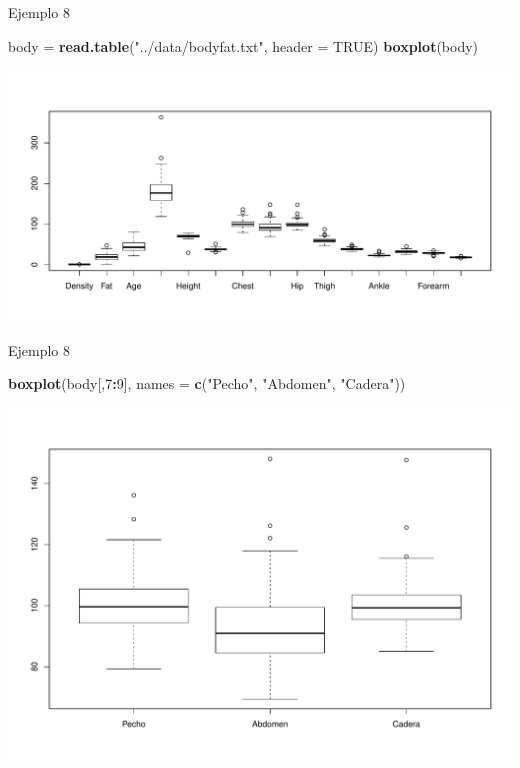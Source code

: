 \documentclass[
  ignorenonframetext,
]{beamer}
\newenvironment{Shaded}{\begin{snugshade}}{\end{snugshade}}
\newcommand{\DataTypeTok}[1]{\textcolor[rgb]{0.13,0.29,0.53}{#1}}
\newcommand{\DecValTok}[1]{\textcolor[rgb]{0.00,0.00,0.81}{#1}}
\newcommand{\KeywordTok}[1]{\textcolor[rgb]{0.13,0.29,0.53}{\textbf{#1}}}
\newcommand{\NormalTok}[1]{#1}
\newcommand{\OperatorTok}[1]{\textcolor[rgb]{0.81,0.36,0.00}{\textbf{#1}}}
\newcommand{\OtherTok}[1]{\textcolor[rgb]{0.56,0.35,0.01}{#1}}
\newcommand{\StringTok}[1]{\textcolor[rgb]{0.31,0.60,0.02}{#1}}
\begin{document}
\begin{frame}[fragile]{Ejemplo 8}
\protect\hypertarget{ejemplo-8}{}

\begin{Shaded}
\begin{Highlighting}[]
\NormalTok{body =}\StringTok{ }\KeywordTok{read.table}\NormalTok{(}\StringTok{"../data/bodyfat.txt"}\NormalTok{, }\DataTypeTok{header =} \OtherTok{TRUE}\NormalTok{)}
\KeywordTok{boxplot}\NormalTok{(body)}
\end{Highlighting}
\end{Shaded}

\includegraphics{Tema8.-Datos-Cuantitativos_files/figure-beamer/unnamed-chunk-27-1.pdf}

\end{frame}

\begin{frame}[fragile]{Ejemplo 8}
\protect\hypertarget{ejemplo-8-1}{}

\begin{Shaded}
\begin{Highlighting}[]
\KeywordTok{boxplot}\NormalTok{(body[,}\DecValTok{7}\OperatorTok{:}\DecValTok{9}\NormalTok{], }\DataTypeTok{names =} \KeywordTok{c}\NormalTok{(}\StringTok{"Pecho"}\NormalTok{, }\StringTok{"Abdomen"}\NormalTok{, }\StringTok{"Cadera"}\NormalTok{))}
\end{Highlighting}
\end{Shaded}

\includegraphics{Tema8.-Datos-Cuantitativos_files/figure-beamer/unnamed-chunk-28-1.pdf}

\end{frame}
\end{document}
